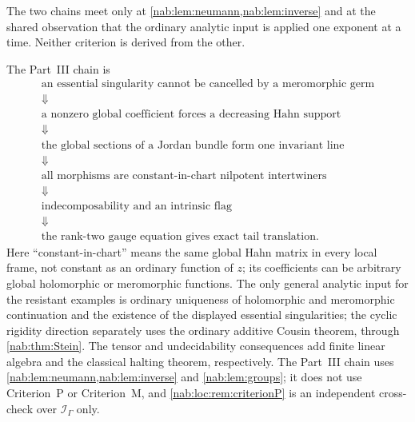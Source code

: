 \documentclass[11pt,letterpaper]{article}
\theoremstyle{definition}
\theoremstyle{remark}
\newcommand{\II}{\mathscr I_\Gamma}
\numberwithin{equation}{section}
\begin{document}
The two chains meet only at \cref{nab:lem:neumann,nab:lem:inverse} and at the
shared observation that the ordinary analytic input is applied one exponent at
a time. Neither criterion is derived from the other.

The Part~III chain is
\[
\begin{gathered}
\text{an essential singularity cannot be cancelled by a meromorphic germ}\\
\Downarrow\\
\text{a nonzero global coefficient forces a decreasing Hahn support}\\
\Downarrow\\
\text{the global sections of a Jordan bundle form one invariant line}\\
\Downarrow\\
\text{all morphisms are constant-in-chart nilpotent intertwiners}\\
\Downarrow\\
\text{indecomposability and an intrinsic flag}\\
\Downarrow\\
\text{the rank-two gauge equation gives exact tail translation.}
\end{gathered}
\]
Here ``constant-in-chart'' means the same global Hahn matrix in every local
frame, not constant as an ordinary function of $z$; its coefficients can be
arbitrary global holomorphic or meromorphic functions. The only general
analytic input for the resistant examples is ordinary uniqueness of
holomorphic and meromorphic continuation and the existence of the displayed
essential singularities; the cyclic rigidity direction separately uses the
ordinary additive Cousin theorem, through \cref{nab:thm:Stein}. The tensor and
undecidability consequences add finite linear algebra and the classical halting
theorem, respectively. The Part~III chain uses
\cref{nab:lem:neumann,nab:lem:inverse} and \cref{nab:lem:groups}; it does not
use Criterion~P or Criterion~M, and \cref{nab:loc:rem:criterionP} is an
independent cross-check over $\II$ only.
\end{document}
